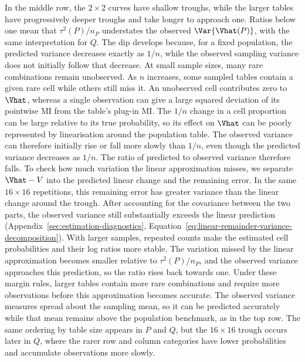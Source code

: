 In the middle row, the \(2\times2\) curves have shallow troughs,
while the larger tables have progressively deeper troughs and take
longer to approach one. Ratios below one mean that \(\tau^2(P)/n_P\)
understates the observed \(\Var\{\Vhat(P)\}\), with the same
interpretation for \(Q\). The dip develops because, for a fixed
population, the predicted variance decreases exactly as \(1/n\), while
the observed sampling variance does not initially follow that decrease.
At small sample sizes, many rare combinations remain unobserved. As
\(n\) increases, some sampled tables contain a given rare cell while
others still miss it. An unobserved cell contributes zero to \(\Vhat\),
whereas a single observation can give a large squared deviation of its
pointwise MI from the table's plug-in MI. The \(1/n\) change in a cell
proportion can be large relative to its true probability, so its effect
on \(\Vhat\) can be poorly represented by linearisation around the
population table. The observed variance can therefore initially rise or fall more slowly than
\(1/n\), even though the predicted variance decreases as \(1/n\). The
ratio of predicted to observed variance therefore falls.
To check how much variation the linear approximation misses, we separate
\(\Vhat-V\) into the predicted linear change and the remaining error.
In the same \(16\times16\) repetitions, this remaining error has greater
variance than the linear change around the trough. After accounting for
the covariance between the two parts, the observed variance still
substantially exceeds the linear prediction
(Appendix~\ref{sec:estimation-diagnostics},
Equation~\eqref{eq:linear-remainder-variance-decomposition}).
With larger samples, repeated
counts make the estimated cell probabilities and their log ratios more
stable. The variation missed by the linear approximation becomes smaller
relative to \(\tau^2(P)/n_P\), and the observed variance approaches
this prediction, so the ratio rises back towards one. Under these margin
rules, larger tables contain more rare combinations and require more
observations before this approximation becomes accurate. The observed
variance measures spread about the sampling mean, so it can be predicted
accurately while that mean remains above the population benchmark, as
in the top row. The same ordering by table size appears in \(P\) and
\(Q\), but the \(16\times16\) trough occurs later in \(Q\), where the
rarer row and column categories have lower probabilities and accumulate
observations more slowly.


